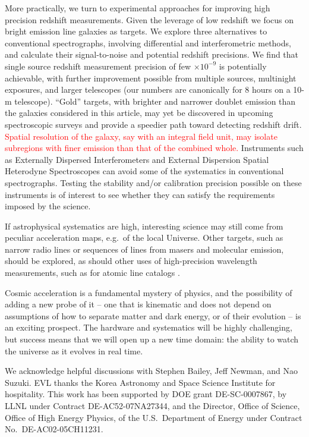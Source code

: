 \documentclass[preprint2, 10pt]{aastex}
\begin{document}
More practically, we turn to experimental approaches for improving high 
precision redshift measurements. Given the leverage of low redshift 
we focus on bright emission line galaxies as targets. We explore three 
alternatives to conventional spectrographs, involving differential and 
interferometric methods, and calculate their signal-to-noise 
and potential redshift precisions. We find that single source redshift 
measurement precision of few $\times 10^{-9}$ is potentially achievable, 
with further improvement possible from multiple sources, multinight 
exposures, and larger telescopes (our numbers are canonically for 8 hours 
on a 10-m telescope). ``Gold'' targets, with brighter and narrower doublet
emission than the galaxies considered in this article, may yet be discovered
in upcoming spectroscopic surveys and provide a speedier path toward
detecting redshift drift. 
\textcolor{red}{
Spatial resolution of the galaxy, say with an integral field unit, may isolate
subregions with finer emission than that of the combined whole.
}
Instruments 
such as Externally Dispersed Interferometers and External Dispersion Spatial 
Heterodyne Spectroscopes can avoid some of the systematics in conventional 
spectrographs. 
Testing the stability and/or calibration precision possible on these 
instruments is of interest to see whether they can satisfy the requirements 
imposed by the science. 

If astrophysical systematics are high, interesting science may still come 
from peculiar acceleration maps, e.g.\ of the local Universe. 
Other targets, such as narrow radio lines or sequences of lines
from masers and molecular emission, should be 
explored, as should other uses of high-precision wavelength measurements, 
such as for atomic line catalogs \citep{2008PhLB..660...81A,
2008MNRAS.391.1308Q,
2012PhR...521...95Q}. 

Cosmic acceleration is a fundamental mystery of physics, and the possibility 
of adding a new probe of it -- one that is kinematic and does not depend on 
assumptions of how to separate matter and dark energy, or of their evolution -- 
is an exciting prospect. The hardware and systematics will be highly 
challenging, but success means that we will open up a new time domain: the 
ability to watch the universe as it evolves in real time. 


\acknowledgments 

We acknowledge helpful discussions with Stephen Bailey, Jeff Newman, and 
Nao Suzuki. EVL thanks the 
Korea Astronomy and Space Science Institute for hospitality. 
This work has been supported by DOE grant DE-SC-0007867,
by LLNL under Contract DE-AC52-07NA27344, and the Director, 
Office of Science, Office of High Energy Physics, 
of the U.S.\ Department of Energy under Contract No.\ DE-AC02-05CH11231. 



 
\end{document}
